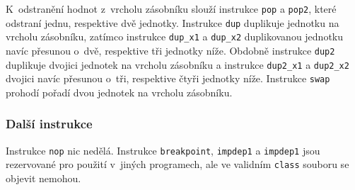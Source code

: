 K~odstranění hodnot z~vrcholu zásobníku slouží instrukce \texttt{pop} a \texttt{pop2}, které odstraní jednu, respektive dvě jednotky. Instrukce \texttt{dup} duplikuje jednotku na vrcholu zásobníku, zatímco instrukce \texttt{dup\_x1} a \texttt{dup\_x2} duplikovanou jednotku navíc přesunou o~dvě, respektive tři jednotky níže. Obdobně instrukce \texttt{dup2} duplikuje dvojici jednotek na vrcholu zásobníku a instrukce \texttt{dup2\_x1} a \texttt{dup2\_x2} dvojici navíc přesunou o~tři, respektive čtyři jednotky níže. Instrukce 
\texttt{swap} prohodí pořadí dvou jednotek na vrcholu zásobníku.

\subsubsection{Další instrukce}

Instrukce \texttt{nop} nic nedělá. Instrukce \texttt{breakpoint}, \texttt{impdep1} a \texttt{impdep1} jsou rezervované pro použití v~jiných programech, ale ve validním \texttt{class} souboru se objevit nemohou.












